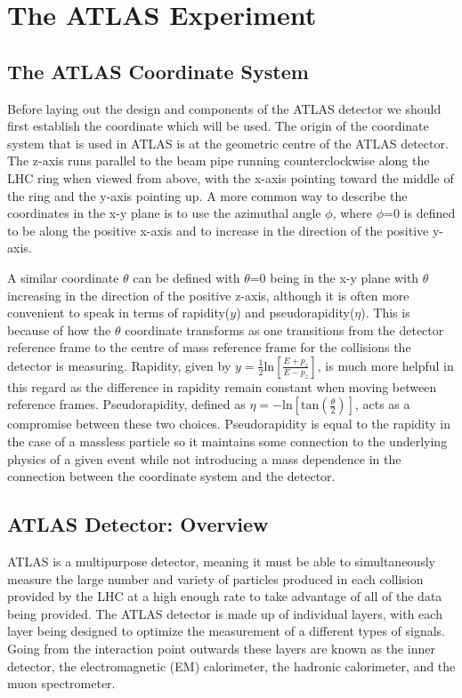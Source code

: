 \section{The ATLAS Experiment}
\label{Sec:ATLAS}

\subsection{The ATLAS Coordinate System}

Before laying out the design and components of the ATLAS detector we should first establish the coordinate which will be used.  
The origin of the coordinate system that is used in ATLAS is at the geometric centre of the ATLAS detector.  
The z-axis runs parallel to the beam pipe running counterclockwise along the LHC ring when viewed from above, with the x-axis pointing toward the middle of the ring and the y-axis pointing up.  
A more common way to describe the coordinates in the x-y plane is to use the azimuthal angle $\phi$, where $\phi$=0 is defined to be along the positive x-axis and to increase in the direction of the positive y-axis.

A similar coordinate $\theta$ can be defined with $\theta$=0 being in the x-y plane with $\theta$ increasing in the direction of the positive z-axis, although it is often more convenient to speak in terms of rapidity($y$) and pseudorapidity($\eta$).  
This is because of how the $\theta$ coordinate transforms as one transitions from the detector reference frame to the centre of mass reference frame for the collisions the detector is measuring.  
Rapidity, given by $y=\frac{1}{2}\mathrm{ln}\left[\frac{E+p_{z}}{E-p_z}\right]$, is much more helpful in this regard as the difference in rapidity remain constant when moving between reference frames.  
Pseudorapidity, defined as $\eta=-\mathrm{ln}\left[\mathrm{tan}\left(\frac{\theta}{2}\right)\right]$, acts as a compromise between these two choices.  
Pseudorapidity is equal to the rapidity in the case of a massless particle so it maintains some connection to the underlying physics of a given event while not introducing a mass dependence in the connection between the coordinate system and the detector.  


\subsection{ATLAS Detector: Overview}

ATLAS is a multipurpose detector, meaning it must be able to simultaneously measure the large number and variety of particles produced in each collision provided by the LHC at a high enough rate to take advantage of all of the data being provided.  
The ATLAS detector is made up of individual layers, with each layer being designed to optimize the measurement of a different types of signals.  
Going from the interaction point outwards these layers are known as the inner detector, the electromagnetic (EM) calorimeter, the hadronic calorimeter, and the muon spectrometer.   


